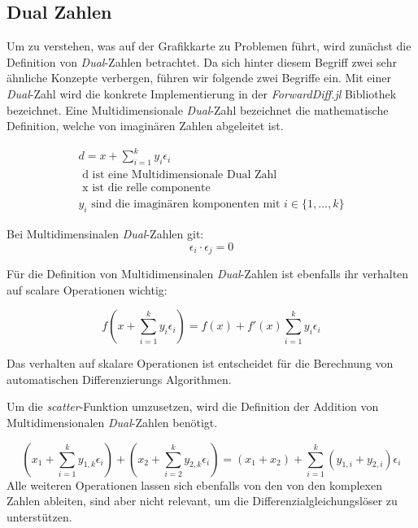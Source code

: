 \subsection{Dual Zahlen}

Um zu verstehen, was auf der Grafikkarte zu Problemen führt, 
wird zunächst die Definition von \textit{Dual}-Zahlen betrachtet.
Da sich hinter diesem Begriff zwei sehr ähnliche Konzepte verbergen, 
führen wir folgende zwei Begriffe ein.
Mit einer \textit{Dual}-Zahl wird die konkrete Implementierung in der \textit{ForwardDiff.jl} Bibliothek bezeichnet.
Eine Multidimensionale \textit{Dual}-Zahl bezeichnet die mathematische Definition, 
welche von imaginären Zahlen abgeleitet ist.

\begin{gather*}
 d = x + \sum_{i = 1}^{k} y_i \epsilon_i \\
	\text{ d ist eine Multidimensionale Dual Zahl } \\
	\text{ x ist die relle componente } \\
	y_i \text{ sind die imaginären komponenten mit } i \in \{1, ..., k\}
\end{gather*}

Bei Multidimensinalen \textit{Dual}-Zahlen git:
\begin{equation}
 \epsilon_i \cdot \epsilon_j = 0
\end{equation}

Für die Definition von Multidimensinalen \textit{Dual}-Zahlen \cite{juliaForwardDiffPackage}
ist ebenfalls ihr verhalten auf scalare Operationen wichtig:

\begin{equation}
 f( x + \sum_{i = 1}^{k} y_i \epsilon_i  ) = f(x) +  f'(x) \sum_{i = 1}^{k} y_i \epsilon_i
\end{equation}

Das verhalten auf skalare Operationen ist entscheidet 
für die Berechnung von automatischen Differenzierungs Algorithmen.

Um die \textit{scatter}-Funktion umzusetzen, 
wird die Definition der Addition von Multidimensionalen \textit{Dual}-Zahlen \cite{RecentAdvances} benötigt.

\begin{equation}
(x_1 + \sum_{i = 1}^{k} y_{1,k} \epsilon_i) + ( x_2 + \sum_{i = 2}^{k} y_{2,k} \epsilon_i) = (x_1 + x_2) + \sum_{i = 1}^{k} (y_{1, i} + y_{2, i}) \epsilon_i
\end{equation}
Alle weiteren Operationen lassen sich ebenfalls von den von den komplexen Zahlen ableiten, 
sind aber nicht relevant, um die Differenzialgleichungslöser zu unterstützen.
